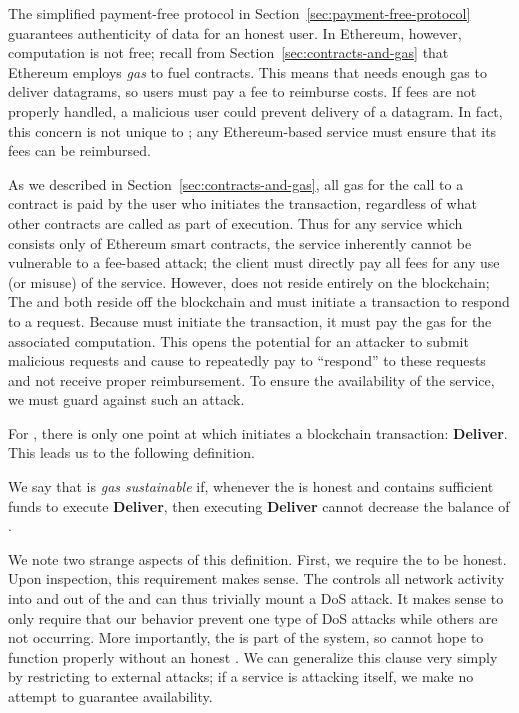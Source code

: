 The simplified payment-free protocol in Section~\ref{sec:payment-free-protocol} guarantees authenticity of data for an honest user.
In Ethereum, however, computation is not free; recall from Section~\ref{sec:contracts-and-gas} that Ethereum employs \emph{gas} to fuel contracts.
This means that \tc needs enough gas to deliver datagrams, so users must pay a fee to reimburse costs.
If fees are not properly handled, a malicious user could prevent delivery of a datagram.
In fact, this concern is not unique to \tc; any Ethereum-based service must ensure that its fees can be reimbursed.

As we described in Section~\ref{sec:contracts-and-gas}, all gas for the call to a contract is paid by the user who initiates the transaction,
regardless of what other contracts are called as part of execution.
Thus for any service which consists only of Ethereum smart contracts, the service inherently cannot be vulnerable to a fee-based attack;
the client must directly pay all fees for any use (or misuse) of the service.
However, \tc does not reside entirely on the blockchain;
The \medname and \encname both reside off the blockchain and must initiate a transaction to respond to a request.
Because \tc must initiate the transaction, it must pay the gas for the associated computation.
This opens the potential for an attacker to submit malicious requests and cause \tc to repeatedly pay to ``respond'' to these requests and not receive proper reimbursement.
To ensure the availability of the service, we must guard against such an attack.

For \tc, there is only one point at which \tc initiates a blockchain transaction: {\bf Deliver}.
This leads us to the following definition.

\begin{definition}
  \label{def:tc-gas-sustainability}
  We say that \tc is \emph{gas sustainable} if, whenever the \medname is honest and \tcadd contains sufficient funds to execute {\bf Deliver},
  then executing {\bf Deliver} cannot decrease the balance of \tcadd.
\end{definition}

We note two strange aspects of this definition.
First, we require the \medname to be honest.
Upon inspection, this requirement makes sense.
The \medname controls all network activity into and out of the \encname and can thus trivially mount a DoS attack.
It makes sense to only require that our behavior prevent one type of DoS attacks while others are not occurring.
More importantly, the \medname is part of the \tc system, so \tc cannot hope to function properly without an honest \medname.
We can generalize this clause very simply by restricting to external attacks;
if a service is attacking itself, we make no attempt to guarantee availability.

